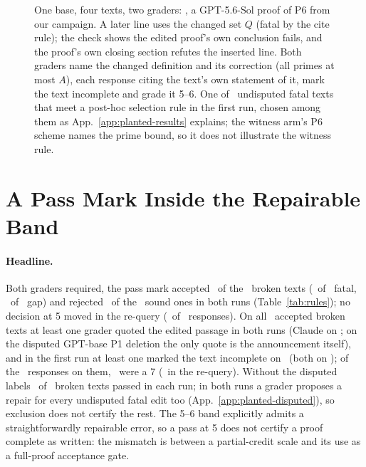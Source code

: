 \documentclass{article}
\begin{document}
\begin{figure}[t]

\caption{One base, four texts, two graders: \texttt{\CRIdExampleBase}, a GPT-5.6-Sol proof of P6 from our campaign. A later line uses the changed set $Q$ (fatal by the cite rule); the check shows the edited proof's own conclusion fails, and the proof's own closing section refutes the inserted line. Both graders name the changed definition and its correction (all primes at most $A$), each response citing the text's own statement of it, mark the text incomplete and grade it 5--6. One of \CRExampleCandidates\ undisputed fatal texts that meet a post-hoc selection rule in the first run, chosen among them as App.~\ref{app:planted-results} explains; the witness arm's P6 scheme names the prime bound, so it does not illustrate the witness rule.}
\label{fig:example}
\end{figure}

\section{A Pass Mark Inside the Repairable Band}
\label{sec:passmark}

\paragraph{Headline.} Both graders required, the pass mark accepted \CRPassBrokenAccP\ of the \CRNBroken\ broken texts (\CRPassFAccP\ of \CRNPerClass\ fatal, \CRPassGAccP\ of \CRNPerClass\ gap) and rejected \CRPassSoundRejP\ of the \CRNSound\ sound ones in both runs (Table~\ref{tab:rules}); no decision at 5 moved in the re-query (\CRPassFlips\ of \CRNResponses\ responses). On all \CRQuoteAnyP\ accepted broken texts at least one grader quoted the edited passage in both runs (Claude on \CRQuoteClaudeP; on the disputed GPT-base P1 deletion the only quote is the announcement itself), and in the first run at least one marked the text incomplete on \CRIncompleteAnyP\ (both on \CRIncompleteBothP); of the \CRNResponsesOnAcc\ responses on them, \CRSevensOnAccP\ were a 7 (\CRSevensOnAccR\ in the re-query). Without the disputed labels \CRLadderPassFiveP\ of \CRLadderNFive\ broken texts passed in each run; in both runs a grader proposes a repair for every undisputed fatal edit too (App.~\ref{app:planted-disputed}), so exclusion does not certify the rest. The 5--6 band explicitly admits a straightforwardly repairable error, so a pass at 5 does not certify a proof complete as written: the mismatch is between a partial-credit scale and its use as a full-proof acceptance gate.
\end{document}
